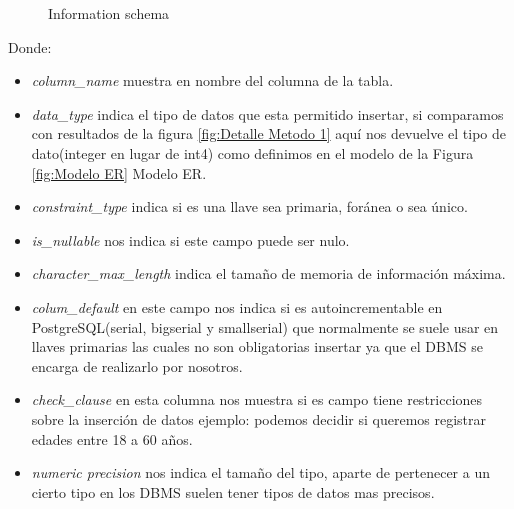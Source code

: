 \begin{figure}[H]
\centering
{}
\caption{Information schema} \label{fig:Detalle Metodo 2}
\end{figure}
Donde:
\begin{itemize}
\item \emph{column\_name} muestra en nombre del columna de la tabla.
\item \emph{data\_type} indica el tipo de datos que esta permitido insertar, si comparamos con resultados de la figura \ref{fig:Detalle Metodo 1} aqu\'i nos devuelve el tipo de dato(integer en lugar de int4) como definimos en el modelo de la Figura \ref{fig:Modelo ER} Modelo ER.
\item \emph{constraint\_type} indica si es una llave sea primaria, for\'anea o sea \'unico.
\item \emph{is\_nullable} nos indica si este campo puede ser nulo.
\item \emph{character\_max\_length} indica el tama\~no de memoria de informaci\'on m\'axima.
\item \emph{colum\_default} en este campo nos indica si es autoincrementable en PostgreSQL(serial, bigserial y smallserial) que normalmente se suele usar en llaves primarias las cuales no son obligatorias insertar ya que el DBMS se encarga de realizarlo por nosotros.
\item \emph{check\_clause} en esta columna nos muestra si es campo tiene restricciones sobre la inserci\'on de datos ejemplo: podemos decidir si queremos registrar edades entre 18 a 60 a\~nos. 
\item \emph{numeric precision} nos indica el tama\~no del tipo, aparte de pertenecer a un cierto tipo en los DBMS suelen tener tipos de datos mas precisos.  
\end{itemize}
